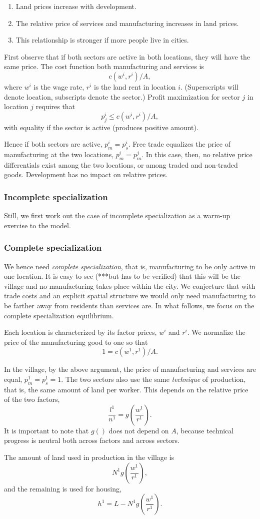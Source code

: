 \documentclass[12pt]{article}
\begin{document}
\begin{enumerate}
  \item Land prices increase with development.
  \item The relative price of services and manufacturing increases in land prices.
  \item This relationship is stronger if more people live in cities.
\end{enumerate}

First observe that if both sectors are active in both locations, they will have the same price. The cost function both manufacturing and services is
\[
c(w^i,r^i)/A,
\]
where $w^i$ is the wage rate, $r^i$ is the land rent in location $i$. (Superscripts will denote location, subscripts denote the sector.) Profit maximization for sector $j$ in location $j$ requires that
\[
p_j^i \le c(w^i,r^i)/A,
\]
with equality if the sector is active (produces positive amount).

Hence if both sectors are active, $p_m^i = p_s^i$. Free trade equalizes the price of manufacturing at the two locations, $p_m^i = p_m^j$. In this case, then, no relative price differentials exist among the two locations, or among traded and non-traded goods. Development has no impact on relative prices.

\subsubsection{Incomplete specialization}
Still, we first work out the case of incomplete specialization as
a warm-up exercise to the model.

\subsubsection{Complete specialization}

We hence need \emph{complete specialization}, that is, manufacturing to be only active in one location. It is easy to see (***but has to be verified) that this will be the village and no manufacturing takes place within the city. We conjecture that with trade costs and an explicit spatial structure we would only need manufacturing to be farther away from residents than services are. In what follows, we focus on the complete specialization equilibrium.

Each location is characterized by its factor prices, $w^i$ and $r^i$. We normalize the price of the manufacturing good to one so that
\[
1 = c(w^1,r^1)/A.
\]

In the village, by the above argument, the price of manufacturing and services are equal, $p_m^1 = p_s^1=1$. The two sectors also use the same \emph{technique} of production, that is, the same amount of land per worker. This depends on the relative price of the two factors,
\[
\frac{l^1}{n^1} = g\left(\frac{w^1}{r^1}\right).
\]
It is important to note that $g()$ does not depend on $A$, because technical progress is neutral both across factors and across sectors.

The amount of land used in production in the village is
\[
N^1g\left(\frac{w^1}{r^1}\right),
\]
and the remaining is used for housing,
\[
h^1 = L-N^1g\left(\frac{w^1}{r^1}\right).
\]
\end{document}
